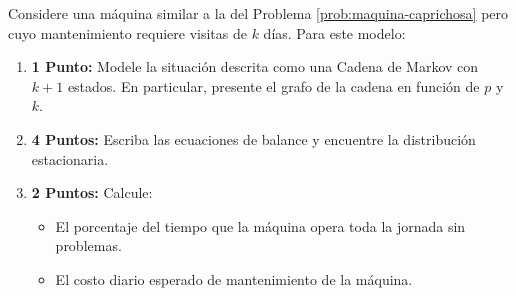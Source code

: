 \documentclass[ a4paper, twoside, 11pt]{article}
\begin{document}
\begin{problem} Considere una m\'aquina similar a la del Problema \ref{prob:maquina-caprichosa} pero cuyo mantenimiento requiere visitas de $k$ d\'ias. Para este modelo: 
\begin{enumerate}[label=\textbf{\alph*)}]
\item \textbf{1 Punto:} Modele la situaci\'on descrita como una Cadena de Markov con $k+1$ estados. \linebreak En particular, presente el grafo de la cadena en funci\'on de $p$ y $k$. 
\item \textbf{4 Puntos:} Escriba las ecuaciones de balance y encuentre la distribuci\'on estacionaria. 
\item \textbf{2 Puntos:} Calcule: 
\begin{itemize}
\item El porcentaje del tiempo que la m\'aquina opera toda la jornada sin problemas. 
\item El costo diario esperado de mantenimiento de la m\'aquina. 
\end{itemize}

\end{enumerate}

\end{problem}
\vspace{\baselineskip}
\end{document}
